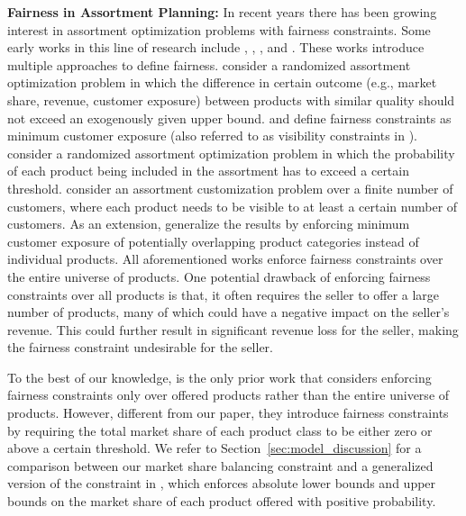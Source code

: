 \documentclass[mnsc,non-blindrev]{informs3}
\theoremstyle{definition}
\begin{document}
\noindent\textbf{Fairness in Assortment Planning:} In recent years there has been growing interest in assortment optimization problems with fairness constraints. Some early works in this line of research include \cite{chen2022fair}, \cite{lu2023simple}, \cite{barre2023assortment}, \cite{housni2024assortment} and \cite{zhu2024unified}. These works introduce multiple approaches to define fairness. \cite{chen2022fair} consider a randomized assortment optimization problem in which the difference in certain outcome (e.g., market share, revenue, customer exposure) between products with similar quality should not exceed an exogenously given upper bound. \cite{lu2023simple} and \cite{barre2023assortment} define fairness constraints as minimum customer exposure (also referred to as visibility constraints in \cite{barre2023assortment}). \cite{lu2023simple} consider a randomized assortment optimization problem in which the probability of each product being included in the assortment has to exceed a certain threshold. \cite{barre2023assortment} consider an assortment customization problem over a finite number of customers, where each product needs to be visible to at least a certain number of customers. As an extension, \cite{housni2024assortment} generalize the results by enforcing minimum customer exposure of potentially overlapping product categories instead of individual products. {  All aforementioned works enforce fairness constraints over the entire universe of products. One potential drawback of enforcing fairness constraints over all products is that, it often requires the seller to offer a large number of products, many of which could have a negative impact on the seller's revenue. This could further result in significant revenue loss for the seller, making the fairness constraint undesirable for the seller.} 

{  To the best of our knowledge, \cite{zhu2024unified} is the only prior work that considers enforcing fairness constraints only over offered products rather than the entire universe of products. However, different from our paper, they introduce fairness constraints by requiring the total market share of each product class to be either zero or above a certain threshold. We refer to Section~\ref{sec:model_discussion} for a comparison between our market share balancing constraint and a generalized version of the constraint in \cite{zhu2024unified}, which enforces absolute lower bounds and upper bounds on the market share of each product offered with positive probability.}
\end{document}
